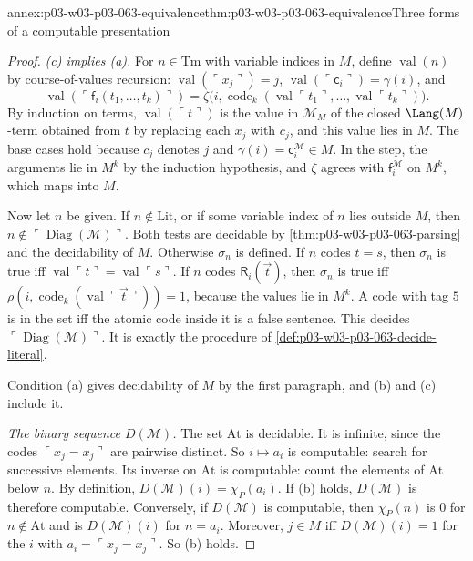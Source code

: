 \begin{annexitem}{annex:p03-w03-p03-063-equivalence}{thm:p03-w03-p03-063-equivalence}{Three forms of a computable presentation}
\begin{proof}
\emph{(c) implies (a).}  For \(n\in\mathrm{Tm}\) with variable indices in
\(M\), define \(\operatorname{val}(n)\) by course-of-values recursion:
\(\operatorname{val}(\ulcorner x_j\urcorner)=j\),
\(\operatorname{val}(\ulcorner\mathsf c_i\urcorner)=\gamma(i)\), and
\[
 \operatorname{val}(\ulcorner\mathsf f_i(t_1,\ldots,t_k)\urcorner)
 =\zeta\bigl(i,\operatorname{code}_k(\operatorname{val}\ulcorner t_1\urcorner,\ldots,\operatorname{val}\ulcorner t_k\urcorner)\bigr).
\]
By induction on terms, \(\operatorname{val}(\ulcorner t\urcorner)\) is the
value in \(\mathcal M_M\) of the closed \(\Lang(M)\)-term obtained from \(t\)
by replacing each \(x_j\) with \(c_j\), and this value lies in \(M\).  The
base cases hold because \(c_j\) denotes \(j\) and
\(\gamma(i)=\mathsf c_i^{\mathcal M}\in M\).  In the step, the arguments lie
in \(M^k\) by the induction hypothesis, and \(\zeta\) agrees with
\(\mathsf f_i^{\mathcal M}\) on \(M^k\), which maps into \(M\).

Now let \(n\) be given.  If \(n\notin\mathrm{Lit}\), or if some variable
index of \(n\) lies outside \(M\), then
\(n\notin\ulcorner\operatorname{Diag}(\mathcal M)\urcorner\).  Both tests are
decidable by \cref{thm:p03-w03-p03-063-parsing} and the decidability of
\(M\).  Otherwise \(\sigma_n\) is defined.  If \(n\) codes \(t=s\),
then \(\sigma_n\) is true iff
\(\operatorname{val}\ulcorner t\urcorner=\operatorname{val}\ulcorner s\urcorner\).
If \(n\) codes \(\mathsf R_i(\vec t)\), then \(\sigma_n\) is true iff
\(\rho(i,\operatorname{code}_k(\operatorname{val}\ulcorner\vec t\urcorner))=1\),
because the values lie in \(M^k\).  A code with tag \(5\) is in the set iff
the atomic code inside it is a false sentence.  This decides
\(\ulcorner\operatorname{Diag}(\mathcal M)\urcorner\).  It is exactly the
procedure of \cref{def:p03-w03-p03-063-decide-literal}.

Condition (a) gives decidability of \(M\) by the first paragraph, and (b) and
(c) include it.

\emph{The binary sequence \(D(\mathcal M)\).}  The set \(\mathrm{At}\) is
decidable.  It is infinite, since the codes \(\ulcorner x_j=x_j\urcorner\) are
pairwise distinct.  So \(i\mapsto a_i\) is computable: search for successive
elements.  Its inverse on \(\mathrm{At}\) is computable: count the elements
of \(\mathrm{At}\) below \(n\).  By definition,
\(D(\mathcal M)(i)=\chi_P(a_i)\).  If (b) holds, \(D(\mathcal M)\) is
therefore computable.  Conversely, if \(D(\mathcal M)\) is computable, then
\(\chi_P(n)\) is \(0\) for \(n\notin\mathrm{At}\) and is \(D(\mathcal M)(i)\)
for \(n=a_i\).  Moreover,
\(j\in M\) iff \(D(\mathcal M)(i)=1\) for the \(i\) with
\(a_i=\ulcorner x_j=x_j\urcorner\).  So (b) holds.
\end{proof}
\end{annexitem}

